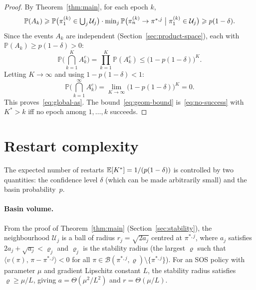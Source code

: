 \documentclass[a4paper,oneside,11pt]{report}
\newcommand{\Prob}{\mathbb{P}}
\newcommand{\calB}{\mathcal{B}}
\newcommand{\calU}{\mathcal{U}}
\newcommand{\ip}[2]{\langle #1,\, #2 \rangle}
\numberwithin{theorem}{chapter}
\numberwithin{equation}{chapter}
\begin{document}
\begin{proof}
  By Theorem~\ref{thm:main}, for each epoch $k$,
  \begin{equation}
    \Prob(A_k) \ge \Prob\bigl(\pi_1^{(k)} \in \textstyle\bigcup_j
    \calU_j\bigr) \cdot \min_j \Prob\bigl(\pi_n^{(k)} \to \pi^{*,j}
    \bigm| \pi_1^{(k)} \in \calU_j\bigr)
    \ge p(1-\delta).
    \label{eq:epoch-success}
  \end{equation}
  Since the events $A_k$ are independent
  (Section~\ref{sec:product-space}), each with
  $\Prob(A_k) \ge p(1-\delta) > 0$:
  \begin{equation}
    \Prob\bigl(\textstyle\bigcap_{k=1}^K A_k^c\bigr)
    = \prod_{k=1}^K \Prob(A_k^c)
    \le \bigl(1 - p(1-\delta)\bigr)^K.
    \label{eq:no-success}
  \end{equation}
  Letting $K \to \infty$ and using
  $1 - p(1-\delta) < 1$:
  \begin{equation}
    \Prob\bigl(\textstyle\bigcap_{k=1}^\infty A_k^c\bigr)
    = \lim_{K \to \infty} \bigl(1 - p(1-\delta)\bigr)^K = 0.
    \label{eq:as-convergence}
  \end{equation}
  This proves~\eqref{eq:global-as}. The bound~\eqref{eq:geom-bound}
  is~\eqref{eq:no-success} with $K^* > k$ iff no epoch among
  $1, \ldots, k$ succeeds.
\end{proof}

\section{Restart complexity}
\label{sec:restart-complexity}

The expected number of restarts $\mathbb{E}[K^*] = 1/(p(1-\delta))$ is
controlled by two quantities: the confidence level $\delta$ (which can
be made arbitrarily small) and the basin probability~$p$.

\paragraph{Basin volume.}
From the proof of Theorem~\ref{thm:main}
(Section~\ref{sec:stability}), the neighbourhood $\calU_j$ is a ball of
radius $r_j = \sqrt{2a_j}$ centred at $\pi^{*,j}$, where $a_j$
satisfies $2a_j + \sqrt{a_j} < \varrho_j$ and $\varrho_j$ is the
stability radius (the largest $\varrho$ such that
$\ip{v(\pi)}{\pi - \pi^{*,j}} < 0$ for all
$\pi \in \calB(\pi^{*,j}, \varrho) \setminus \{\pi^{*,j}\}$). For an
SOS policy with parameter $\mu$ and gradient Lipschitz constant $L$,
the stability radius satisfies $\varrho \ge \mu / L$, giving
$a = \Theta(\mu^2/L^2)$ and $r = \Theta(\mu/L)$.
\end{document}
